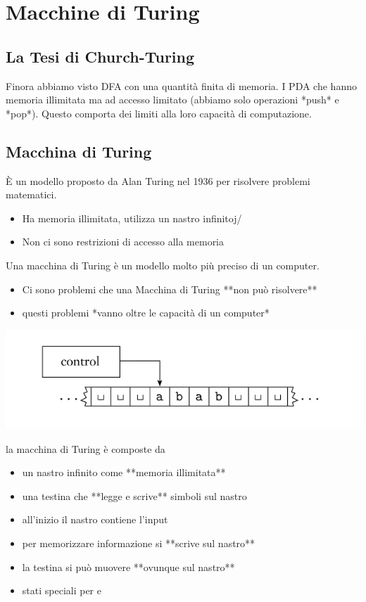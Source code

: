\section{Macchine di Turing}
\subsection{La Tesi di Church-Turing}
Finora abbiamo visto DFA con una quantità finita di memoria. I PDA che hanno memoria illimitata ma ad accesso limitato (abbiamo solo operazioni *push* e *pop*).
Questo comporta dei limiti alla loro capacità di computazione. 

\subsection{Macchina di Turing}
È un modello proposto da Alan Turing nel 1936 per risolvere problemi matematici.
\begin{itemize}
	\item Ha memoria illimitata, utilizza un nastro infinitoj/
	\item Non ci sono restrizioni di accesso alla memoria
\end{itemize}
Una macchina di Turing è un modello molto più preciso di un computer. 

\begin{itemize}
	\item Ci sono problemi che una Macchina di Turing **non può risolvere**
	\item questi problemi *vanno oltre le capacità di un computer*
\end{itemize}
\includegraphics[scale=0.5]{img/schema_TM.png}

la macchina di Turing è composte da 
\begin{itemize}
	\item un nastro infinito come **memoria illimitata**
	\item una testina che **legge e scrive** simboli sul nastro
	\item all'inizio il nastro contiene l'input
	\item per memorizzare informazione si **scrive sul nastro** 
	\item la testina si può muovere **ovunque sul nastro**
	\item stati speciali per  e  
\end{itemize}

